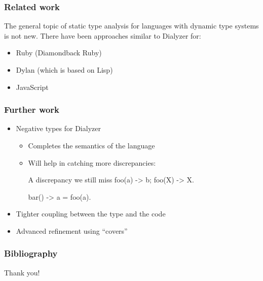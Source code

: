\documentclass{beamer}
\begin{document}
\begin{frame}
  \frametitle{Related work}
  The general topic of static type analysis for languages with dynamic
  type systems is not new. There have been approaches similar to
  Dialyzer for:
  \begin{itemize}
  \item Ruby (Diamondback Ruby)
  \item Dylan (which is based on Lisp)
  \item JavaScript
  \end{itemize}
\end{frame}

\begin{frame}[fragile]
  \frametitle{Further work}
  \begin{itemize}
  \item Negative types for Dialyzer
    \begin{itemize}
    \item Completes the semantics of the language
    \item Will help in catching more discrepancies:
\begin{code}{A discrepancy we still miss}
foo(a) -> b;
foo(X) -> X.

bar() ->
    a = foo(a).
\end{code}
    \end{itemize} \pause
  \item Tighter coupling between the type and the code \pause
  \item Advanced refinement using ``covers''
  \end{itemize}
\end{frame}

\begin{frame}
  \frametitle{Bibliography}
  
  
\end{frame}

\begin{frame}
  \begin{center}
    Thank you!
  \end{center}
\end{frame}
\end{document}

